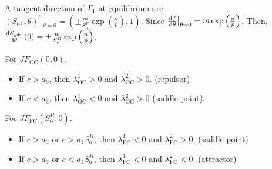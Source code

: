 \documentclass[
    8pt,
    aspectratio=1610,
    c,
    intlimits,
    leqno,
    professionalfonts,
]{beamer}
\begin{document}
\begin{frame}
	A tangent direction of $\Gamma_{1}$ at equilibrium are
	\begin{math}
		\left(S_{\text{o}^{\pm}},\theta\right)^{\prime}\big|_{\theta=0}=
		\left(\pm\frac{m}{S^{R}_{\text{o}}}\exp\left(\frac{n}{p}\right),1\right)
	\end{math}.
	Since
	\begin{math}
		\diff{f}{\theta}\big|_{\theta=0}=
		m\exp\left(\frac{n}{p}\right)
	\end{math}.
	Then,
	\begin{math}
		\diff{S_{\text{o}^{\pm}}}{\theta}\left(0\right)=
		\pm\frac{m}{S^{R}_{\text{o}}}
		\exp\left(\frac{n}{p}\right)
	\end{math}.

	\begin{lemma}\normalfont
		For $JF_{\text{OC}}\left(0,0\right)$.
		\begin{itemize}
			\item

			      If $c>a_{3}$, then $\lambda^{1}_{\text{OC}}>0$ and
			      $\lambda^{2}_{\text{OC}}>0$.
			      (repulsor)

			\item

			      If $c<a_{3}$, then $\lambda^{1}_{\text{OC}}<0$ and
			      $\lambda^{2}_{\text{OC}}>0$ (saddle point).
		\end{itemize}

		For $JF_{\text{FC}}\left(S^{R}_{\text{o}},0\right)$.
		\begin{itemize}
			\item

			      If $c>a_{3}$ or $c>a_{1}S^{R}_{\text{o}}$, then
			      $\lambda^{1}_{\text{FC}}<0$ and $\lambda^{2}_{\text{FC}}>0$.
			      (saddle point)

			\item

			      If $c>a_{3}$ or $c<a_{1}S^{R}_{\text{o}}$, then
			      $\lambda^{1}_{\text{FC}}<0$ and $\lambda^{2}_{\text{FC}}<0$.
			      (attractor)
		\end{itemize}
	\end{lemma}
\end{frame}
\end{document}
